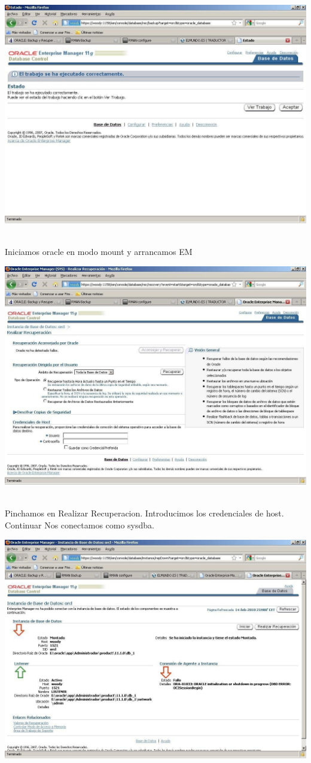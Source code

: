 \begin{enumerate}[1.]
\begin{center}
	\includegraphics[width=15cm]{./Imagenes/eje5}
	\end{center}
	\\Iniciamos oracle en modo mount y arrancamos EM
	\begin{center}
	\includegraphics[width=15cm]{./Imagenes/eje6}
	\end{center}
	\\Pinchamos en Realizar Recuperacion. Introducimos los credenciales de host. Continuar Nos conectamos como sysdba.
	\begin{center}
	\includegraphics[width=15cm]{./Imagenes/eje7}

\end{center}
\end{enumerate}
